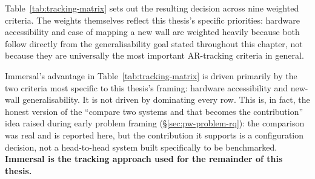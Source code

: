\begin{aitemize}[nosep]
Table~\ref{tab:tracking-matrix} sets out the resulting decision across
nine weighted criteria. The weights themselves reflect this thesis's
specific priorities: hardware accessibility and ease of mapping a new
wall are weighted heavily because both follow directly from the
generalisability goal stated throughout this chapter, not because they
are universally the most important AR-tracking criteria in general.
 
\begin{table}[h]
\centering
\caption{Weighted comparison of the four tracking approaches evaluated.
Scores (1--10) reflect this project's own testing combined with vendor
documentation and the comparative literature cited above, not an
independent third-party benchmark.}
\label{tab:tracking-matrix}
\small
{}
\end{table}
 
Immersal's advantage in Table~\ref{tab:tracking-matrix} is driven
primarily by the two criteria most specific to this thesis's framing:
hardware accessibility and new-wall generalisability. It is not driven
by dominating every row. This is, in fact, the honest version of the
``compare two systems and that becomes the contribution'' idea raised
during early problem framing (\S\ref{sec:pw-problem-rq}): the comparison
was real and is reported here, but the contribution it supports is a
configuration decision, not a head-to-head system built specifically to
be benchmarked. \textbf{Immersal is the tracking approach used for the
remainder of this thesis.}
 

\end{aitemize}
